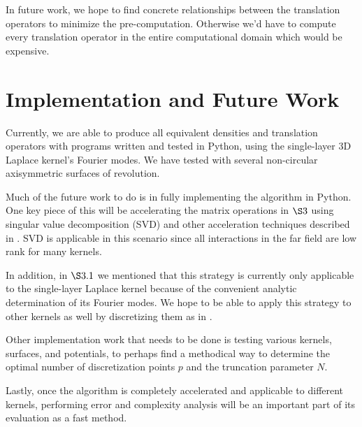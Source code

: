 \documentclass[12pt,letterpaper]{article}
\begin{document}
In future work, we hope to find concrete relationships between the translation operators to minimize the pre-computation. Otherwise we'd have to compute every translation operator in the entire computational domain which would be expensive.

\section{Implementation and Future Work}
Currently, we are able to produce all equivalent densities and translation operators with programs written and tested in Python, using the single-layer 3D Laplace kernel's Fourier modes. We have tested with several non-circular axisymmetric surfaces of revolution.

Much of the future work to do is in fully implementing the algorithm in Python. One key piece of this will be accelerating the matrix operations in $\S3$ using singular value decomposition (SVD) and other acceleration techniques described in \cite{MV}. SVD is applicable in this scenario since all interactions in the far field are low rank for many kernels.

In addition, in $\S3.1$ we mentioned that this strategy is currently only applicable to the single-layer Laplace kernel because of the convenient analytic determination of its Fourier modes. We hope to be able to apply this strategy to other kernels as well by discretizing them as in \cite{YYM}.

Other implementation work that needs to be done is testing various kernels, surfaces, and potentials, to perhaps find a methodical way to determine the optimal number of discretization points $p$ and the truncation parameter $N$.

Lastly, once the algorithm is completely accelerated and applicable to different kernels, performing error and complexity analysis will be an important part of its evaluation as a fast method.
\end{document}
